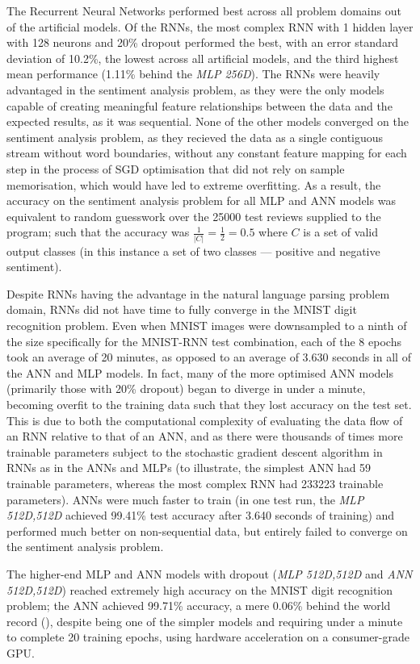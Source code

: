\documentclass[]{report}
\begin{document}
The Recurrent Neural Networks performed best across all problem domains out of the artificial models. Of the RNNs, the most complex RNN with 1 hidden layer with 128 neurons and 20\% dropout performed the best, with an error standard deviation of 10.2\%, the lowest across all artificial models, and the third highest mean performance (1.11\% behind the \emph{MLP 256D}). The RNNs were heavily advantaged in the sentiment analysis problem, as they were the only models capable of creating meaningful feature relationships between the data and the expected results, as it was sequential. None of the other models converged on the sentiment analysis problem, as they recieved the data as a single contiguous stream without word boundaries, without any constant feature mapping for each step in the process of SGD optimisation that did not rely on sample memorisation, which would have led to extreme overfitting. As a result, the accuracy on the sentiment analysis problem for all MLP and ANN models was equivalent to random guesswork over the 25000 test reviews supplied to the program; such that the accuracy was $\frac{1}{|C|} = \frac{1}{2} = 0.5$ where $C$ is a set of valid output classes (in this instance a set of two classes --- positive and negative sentiment).

Despite RNNs having the advantage in the natural language parsing problem domain, RNNs did not have time to fully converge in the MNIST digit recognition problem. Even when MNIST images were downsampled to a ninth of the size specifically for the MNIST-RNN test combination, each of the 8 epochs took an average of 20 minutes, as opposed to an average of 3.630 seconds in all of the ANN and MLP models. In fact, many of the more optimised ANN models (primarily those with 20\% dropout) began to diverge in under a minute, becoming overfit to the training data such that they lost accuracy on the test set. This is due to both the computational complexity of evaluating the data flow of an RNN relative to that of an ANN, and as there were thousands of times more trainable parameters subject to the stochastic gradient descent algorithm in RNNs as in the ANNs and MLPs (to illustrate, the simplest ANN had 59 trainable parameters, whereas the most complex RNN had 233223 trainable parameters). ANNs were much faster to train (in one test run, the \emph{MLP 512D,512D} achieved 99.41\% test accuracy after 3.640 seconds of training) and performed much better on non-sequential data, but entirely failed to converge on the sentiment analysis problem.

The higher-end MLP and ANN models with dropout (\emph{MLP 512D,512D} and \emph{ANN 512D,512D}) reached extremely high accuracy on the MNIST digit recognition problem; the ANN achieved 99.71\% accuracy, a mere 0.06\% behind the world record (\cite{ciregan2012multi}), despite being one of the simpler models and requiring under a minute to complete 20 training epochs, using hardware acceleration on a consumer-grade GPU.
\end{document}
